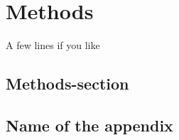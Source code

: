 \documentclass[a4paper, oneside, 11pt]{book}
\begin{document}
\afterpage{\clearpage}
\FloatBarrier


\chapter{Methods}

A few lines if you like

\section{Methods-section}
\lipsum[1-2]

\afterpage{\clearpage}
\FloatBarrier


\appendix
\begin{appendices}
\appendixpage
\addappheadtotoc
\chapter{Name of the appendix}
\end{appendices}

\backmatter
{}
\begin{singlespace}
\small
\printbibliography


\end{singlespace}
\end{document}
